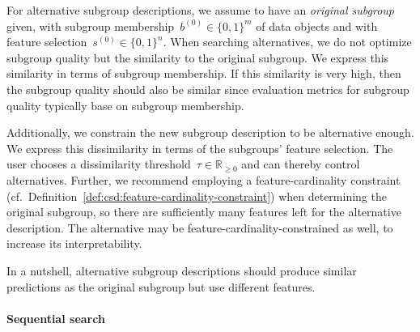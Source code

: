 \documentclass{article}
\theoremstyle{definition}
\begin{document}
For alternative subgroup descriptions, we assume to have an \emph{original subgroup} given, with subgroup membership~$b^{(0)} \in \{0, 1\}^m$ of data objects and with feature selection~$s^{(0)} \in \{0, 1\}^n$.
When searching alternatives, we do not optimize subgroup quality but the similarity to the original subgroup.
We express this similarity in terms of subgroup membership.
If this similarity is very high, then the subgroup quality should also be similar since evaluation metrics for subgroup quality typically base on subgroup membership.

Additionally, we constrain the new subgroup description to be alternative enough.
We express this dissimilarity in terms of the subgroups' feature selection.
The user chooses a dissimilarity threshold~$\tau \in \mathbb{R}_{\geq 0}$ and can thereby control alternatives.
Further, we recommend employing a feature-cardinality constraint (cf.~Definition~\ref{def:csd:feature-cardinality-constraint}) when determining the original subgroup, so there are sufficiently many features left for the alternative description.
The alternative may be feature-cardinality-constrained as well, to increase its interpretability.

In a nutshell, alternative subgroup descriptions should produce similar predictions as the original subgroup but use different features.

\paragraph{Sequential search}
\end{document}
